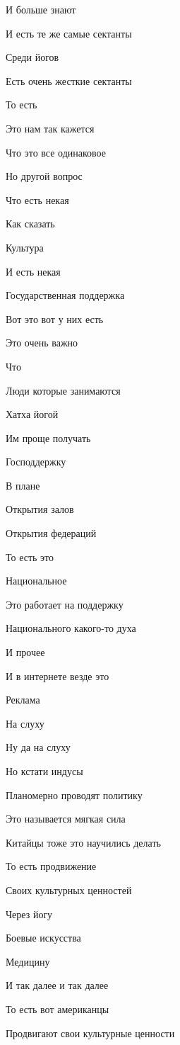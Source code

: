 И больше знают

И есть те же самые сектанты

Среди йогов

Есть очень жесткие сектанты

То есть

Это нам так кажется

Что это все одинаковое

Но другой вопрос

Что есть некая

Как сказать

Культура

И есть некая

Государственная поддержка

Вот это вот у них есть

Это очень важно

Что

Люди которые занимаются

Хатха йогой

Им проще получать

Господдержку

В плане

Открытия залов

Открытия федераций

То есть это

Национальное

Это работает на поддержку

Национального какого-то духа

И прочее

И в интернете везде это

Реклама

На слуху

Ну да на слуху

Но кстати индусы

Планомерно проводят политику

Это называется мягкая сила

Китайцы тоже это научились делать

То есть продвижение

Своих культурных ценностей

Через йогу

Боевые искусства

Медицину

И так далее и так далее

То есть вот американцы

Продвигают свои культурные ценности

